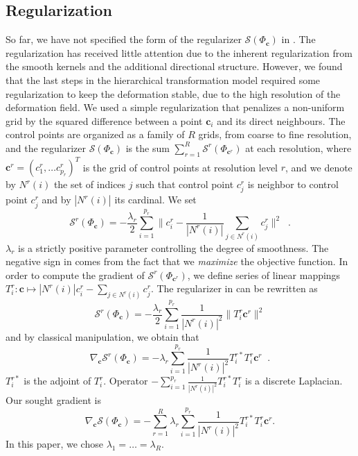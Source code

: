 \documentclass[twocolumn]{svjour3}
\begin{document}
\subsection{Regularization}
So far, we have not specified the form of the regularizer $\mathcal S(\Phi_{\bm c})$ in
.  The regularization has received little attention due to the inherent
regularization from the smooth kernels and the additional directional structure. However,
we found that the last steps in the hierarchical transformation model required some
regularization to keep the deformation stable, due to the high resolution of the
deformation field. We used a simple regularization that penalizes a non-uniform grid by
the squared difference between a point $\bm c_i$ and its direct neighbours. The control
points are organized as a family of $R$ grids, from coarse to fine resolution, and the
regularizer $\mathcal S(\Phi_{\bm c})$ is the sum
$\sum_{r = 1}^R \mathcal{S}^r(\Phi_{\bm c^r})$ at each resolution, where
$\bm c^r = (c^r_1,\dots c^r_{p_r})^T$ is the grid of control points at resolution level
$r$, and we denote by $N^r(i)$ the set of indices $j$ such that control point $c^r_j$ is
neighbor to control point $c^r_j$ and by $|N^r(i)|$ its cardinal. We set
\begin{equation}
    \label{eq:regularizer}
    \mathcal{S}^r(\Phi_{\bm c})= -\frac{\lambda_r}{2}\sum_{i=1}^{p_r} \|c^r_i - \frac{1}{|N^r(i)|}\sum_{j\in N^r(i)} c^r_j\|^2\;\; .
\end{equation}
$\lambda_r$ is a strictly positive parameter controlling the degree of smoothness. The negative sign in  comes from the fact that we \emph{maximize} the objective function. In order to compute the gradient of $\mathcal{S}^r(\Phi_{\bm c^r})$, we define series of linear mappings $T^r_i:\bm c\mapsto |N^r(i)|c^r_i - \sum_{j\in N^r(i)}c^r_j$. The regularizer in  can be rewritten as
\begin{equation}
\mathcal{S}^r(\Phi_{\bm c})=-\frac{\lambda_r}{2}\sum_{i=1}^{p_r}\frac{1}{|N^r(i)|^2}\|T^r_i\bm c^r\|^2
\end{equation}
and by classical manipulation, we obtain that
\begin{equation}
    \label{eq:reggradient}
    \nabla_{\bm c}\mathcal{S}^r(\Phi_{\bm c}) = -\lambda_r\sum_{i=1}^{p_r}\frac{1}{|N^r(i)|^2}T_i^{r*} T_i^r\bm c^r \;\; .
\end{equation}
$T^{r*}_i$ is the adjoint of $T^r_i$. Operator $-\sum_{i=1}^{p_r}\frac{1}{|N^r(i)|^2}T_i^{r*} T^r_i$ is a discrete Laplacian. Our sought gradient is
\begin{equation}
    \nabla_{\bm c}\mathcal{S}(\Phi_{\bm c}) = -\sum_{r = 1}^R\lambda_r\sum_{i=1}^{p_r}\frac{1}{|N^r(i)|^2} T_i^{r*} T^r_i\bm c^r.
\end{equation}
In this paper, we chose $\lambda_1=\dots=\lambda_R$.
\end{document}
